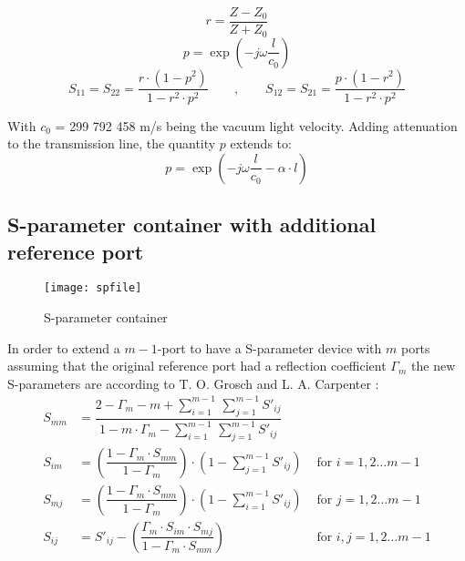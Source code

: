 \begin{equation}
r = \frac{Z-Z_0}{Z+Z_0}
\end{equation}
\begin{equation}
p = \exp\left(-j\omega\frac{l}{c_0}\right)
\end{equation}
\begin{equation}
S_{11} = S_{22} = \frac{r\cdot(1-p^2)}{1-r^2\cdot p^2} \qquad,\qquad
S_{12} = S_{21} = \frac{p\cdot(1-r^2)}{1-r^2\cdot p^2}
\end{equation}

With $c_0$ = 299 792 458 m/s being the vacuum light velocity.
Adding attenuation to the transmission line, the quantity $p$
extends to:
\begin{equation}
p = \exp\left(-j\omega\frac{l}{c_0} - \alpha\cdot l \right)
\end{equation}

\subsection{S-parameter container with additional reference port}
\label{sec:spfile}

\begin{figure}[ht]
\begin{center}
\texttt{[image: spfile]}
\end{center}
\caption{S-parameter container}
\label{fig:spfile}
\end{figure}
\FloatBarrier

In order to extend a $m - 1$-port to have a S-parameter device with
$m$ ports assuming that the original reference port had a reflection
coefficient $\Gamma_m$ the new S-parameters are according to
T. O. Grosch and L. A. Carpenter \cite{Grosch}:
\begin{align}
S_{mm} &= \dfrac{2 - \Gamma_m - m + {\displaystyle\sum_{i=1}^{m-1}}\, {\displaystyle\sum_{j=1}^{m-1}} S'_{ij}}{1 - m\cdot \Gamma_m - {\displaystyle\sum_{i=1}^{m-1}}\, {\displaystyle\sum_{j=1}^{m-1}} S'_{ij}}\\
S_{im} &= \left(\dfrac{1 - \Gamma_m\cdot S_{mm}}{1 - \Gamma_m}\right)\cdot \left(1 - \sum_{j=1}^{m-1} S'_{ij}\right) &
\textrm{ for } i = 1,2 \ldots m - 1\\
S_{mj} &= \left(\dfrac{1 - \Gamma_m\cdot S_{mm}}{1 - \Gamma_m}\right)\cdot \left(1 - \sum_{i=1}^{m-1} S'_{ij}\right) &
\textrm{ for } j = 1,2 \ldots m - 1\\
S_{ij} &= S'_{ij} - \left(\dfrac{\Gamma_m\cdot S_{im}\cdot S_{mj}}{1 - \Gamma_m\cdot S_{mm}}\right) &
\textrm{ for } i,j = 1,2 \ldots m - 1
\end{align}

